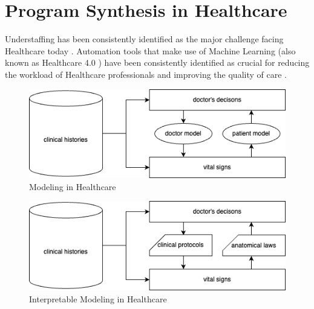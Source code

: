 \section{Program Synthesis in Healthcare}

Understaffing has been consistently identified as the major challenge facing Healthcare today \cite{ashleyy.metcalfHospitalUnitUnderstaffing2016,SurveyShowsHidden1993,UnderstaffingSignificantIssue2012,campbell_universal_2013, hudsonUnderstaffing2015, mercerMessageEditorinChief2008, r.stanleyUnderstaffedOverwhelmed2010, munnUnderstaffingWardsCompromising2017, thelancetHealthcareSystemStaffing2018}. Automation tools that make use of Machine Learning (also known as Healthcare 4.0 \cite{tortorellaHealthcareTrendsChallenges2020}) have been consistently identified as crucial for reducing the workload of Healthcare professionals and improving the quality of care \cite{agrawalMachineLearningHealthcare2020, deviDesignImplementationAdvanced2022, g.kumarSurveyMachineLearning2016, ganguliMachineLearningPursuit2020, maityMachineLearningImproved2017, mitraMachineLearningHealthcare2021, pianykhImprovingHealthcareOperations2020, xhaferraRoleMachineLearning2022}.

\begin{figure}
    \centering
    \includegraphics[width=0.8\linewidth]{images/PatientModeling.drawio.png}
    \caption{Modeling in Healthcare}
    \label{fig:modelhealth}
\end{figure}

\begin{figure}
    \centering
    \includegraphics[width=0.8\linewidth]{images/PatientModelingInter.drawio.png}
    \caption{Interpretable Modeling in Healthcare}
    \label{fig:modelhealthinter}
\end{figure}

